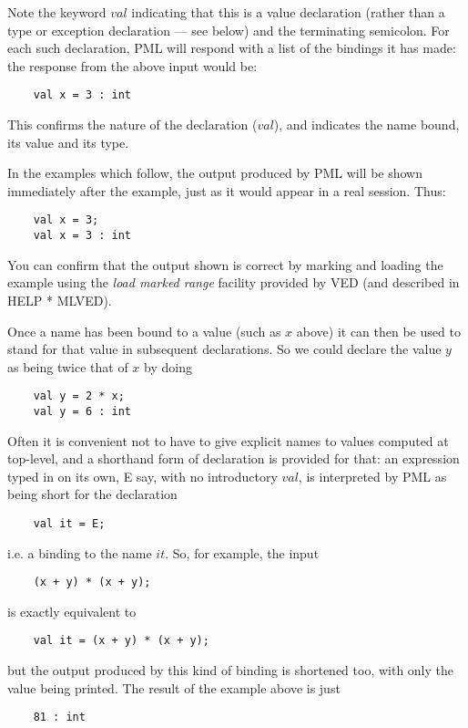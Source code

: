 Note the keyword $val$ indicating that this is a value declaration
(rather than a type or exception declaration --- see below) and the
terminating semicolon. For each such declaration, PML will respond with
a list of the bindings it has made: the response from the above input
would be:
\begin{verbatim}
    val x = 3 : int
\end{verbatim}

This confirms the nature of the declaration ($val$), and indicates the
name bound, its value and its type.

In the examples which follow, the output produced by PML will be shown
immediately after the example, just as it would appear in a real
session. Thus:
\begin{verbatim}
    val x = 3;
    val x = 3 : int
\end{verbatim}

You can confirm that the output shown is correct by marking and loading
the example using the {\em load marked range} facility provided by VED (and
described in HELP * MLVED).

Once a name has been bound to a value (such as $x$ above) it can then be
used to stand for that value in subsequent declarations. So we could
declare the value $y$ as being twice that of $x$ by doing
\begin{verbatim}
    val y = 2 * x;
    val y = 6 : int
\end{verbatim}

Often it is convenient not to have to give explicit names to values
computed at top-level, and a shorthand form of declaration is provided
for that: an expression typed in on its own, E say, with no introductory
$val$, is interpreted by PML as being short for the declaration
\begin{verbatim}
    val it = E;
\end{verbatim}

i.e. a binding to the name $it$. So, for example, the input
\begin{verbatim}
    (x + y) * (x + y);
\end{verbatim}

is exactly equivalent to
\begin{verbatim}
    val it = (x + y) * (x + y);
\end{verbatim}

but the output produced by this kind of binding is shortened too, with
only the value being printed. The result of the example above is just
\begin{verbatim}
    81 : int
\end{verbatim}

